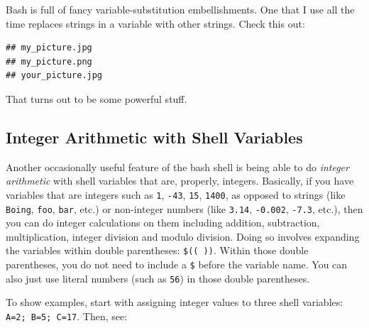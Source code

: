 \documentclass[]{krantz}
\makeatletter
\newenvironment{Shaded}{\begin{snugshade}}{\end{snugshade}}
\newcommand{\BuiltInTok}[1]{#1}
\newcommand{\NormalTok}[1]{#1}
\newcommand{\VariableTok}[1]{\textcolor[rgb]{0,0,0}{#1}}
\newenvironment{kframe}{%
\medskip{}
\setlength{\fboxsep}{.8em}
 \def\at@end@of@kframe{}%
 \ifinner\ifhmode%
  \def\at@end@of@kframe{\end{minipage}}%
  \begin{minipage}{\columnwidth}%
 \fi\fi%
 \def\FrameCommand##1{\hskip\@totalleftmargin \hskip-\fboxsep
 \colorbox{shadecolor}{##1}\hskip-\fboxsep
     \hskip-\linewidth \hskip-\@totalleftmargin \hskip\columnwidth}%
 \MakeFramed {\advance\hsize-\width
   \@totalleftmargin\z@ \linewidth\hsize
   \@setminipage}}%
 {\par\unskip\endMakeFramed%
 \at@end@of@kframe}
\renewenvironment{Shaded}{\begin{kframe}}{\end{kframe}}
\makeatother
\begin{document}
Bash is full of fancy variable-substitution embellishments. One that
I use all the time replaces strings in a variable with other strings.
Check this out:

\begin{Shaded}
\end{Shaded}

\begin{verbatim}
## my_picture.jpg
## my_picture.png
## your_picture.jpg
\end{verbatim}

That turns out to be some powerful stuff.

\hypertarget{bash-arithmetic}{%
\subsection{Integer Arithmetic with Shell Variables}\label{bash-arithmetic}}

Another occasionally useful feature of the bash shell is being able to
do \emph{integer arithmetic} with shell variables that are, properly, integers.
Basically, if you have variables that are integers such as \texttt{1}, \texttt{-43}, \texttt{15}, \texttt{1400}, as
opposed to strings (like \texttt{Boing}, \texttt{foo}, \texttt{bar}, etc.) or non-integer numbers (like
\texttt{3.14}, \texttt{-0.002}, \texttt{-7.3}, etc.), then you can do integer calculations on them including
addition, subtraction, multiplication, integer division and modulo division. Doing so
involves expanding the variables within double parentheses: \texttt{\$((\ ))}. Within those
double parentheses, you do not need to include a \texttt{\$} before the variable name. You can also
just use literal numbers (such as \texttt{56}) in those double parentheses.

To show
examples, start with assigning integer values to three shell variables: \texttt{A=2;\ B=5;\ C=17}. Then, see:
\end{document}
